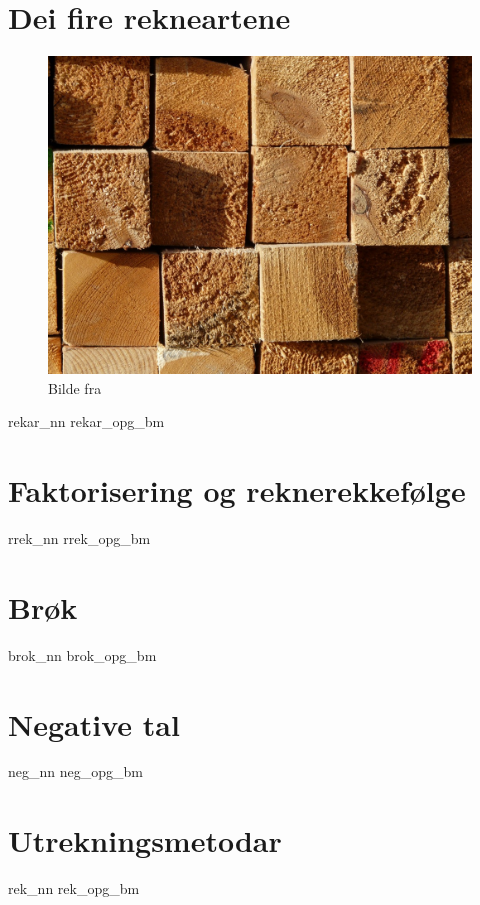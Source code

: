 	\chapter{Dei fire rekneartene \label{Rekneartane}}
	\begin{figure}
		\centering
		\includegraphics[scale=0.38]{wood} \\
		{\footnotesize Bilde fra } 
	\end{figure}
	\newpage
	{rekar_nn}
	{rekar_opg_bm}
	
	
	\chapter{Faktorisering og reknerekkefølge \label{Faktogrek}}
	\newpage
	{rrek_nn}
	{rrek_opg_bm}
	
	\chapter{Brøk \label{Brok}} 
	\newpage
	{brok_nn}
	\newpage
	{brok_opg_bm}
	
	\chapter{Negative tal \label{Negtal}}
	\newpage
	{neg_nn}
	{neg_opg_bm}
	
	\chapter{Utrekningsmetodar \label{Utrekning}}
	\newpage
	{rek_nn}
	\newpage
	{rek_opg_bm}
	
